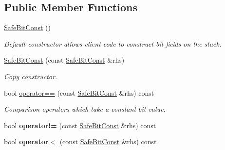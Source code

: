 \subsection*{Public Member Functions}
\begin{DoxyCompactItemize}
\item 
\hypertarget{classLoki_1_1SafeBitConst_a5ca867866c32c41efd30b5912daf48ba}{}\hyperlink{classLoki_1_1SafeBitConst_a5ca867866c32c41efd30b5912daf48ba}{Safe\+Bit\+Const} ()\label{classLoki_1_1SafeBitConst_a5ca867866c32c41efd30b5912daf48ba}

\begin{DoxyCompactList}\small\item\em Default constructor allows client code to construct bit fields on the stack. \end{DoxyCompactList}\item 
\hypertarget{classLoki_1_1SafeBitConst_affc6ec193df68bc5888c3e0249318b09}{}\hyperlink{classLoki_1_1SafeBitConst_affc6ec193df68bc5888c3e0249318b09}{Safe\+Bit\+Const} (const \hyperlink{classLoki_1_1SafeBitConst}{Safe\+Bit\+Const} \&rhs)\label{classLoki_1_1SafeBitConst_affc6ec193df68bc5888c3e0249318b09}

\begin{DoxyCompactList}\small\item\em Copy constructor. \end{DoxyCompactList}\item 
\hypertarget{classLoki_1_1SafeBitConst_afa999efd984ef43c0e8c1a637df87412}{}bool \hyperlink{classLoki_1_1SafeBitConst_afa999efd984ef43c0e8c1a637df87412}{operator==} (const \hyperlink{classLoki_1_1SafeBitConst}{Safe\+Bit\+Const} \&rhs) const \label{classLoki_1_1SafeBitConst_afa999efd984ef43c0e8c1a637df87412}

\begin{DoxyCompactList}\small\item\em Comparison operators which take a constant bit value. \end{DoxyCompactList}\item 
\hypertarget{classLoki_1_1SafeBitConst_aee72c0265542a216c28355cbac610560}{}bool {\bfseries operator!=} (const \hyperlink{classLoki_1_1SafeBitConst}{Safe\+Bit\+Const} \&rhs) const \label{classLoki_1_1SafeBitConst_aee72c0265542a216c28355cbac610560}

\item 
\hypertarget{classLoki_1_1SafeBitConst_ae2ba34c541cdcfffb45f8e0ff3956d23}{}bool {\bfseries operator$<$} (const \hyperlink{classLoki_1_1SafeBitConst}{Safe\+Bit\+Const} \&rhs) const \label{classLoki_1_1SafeBitConst_ae2ba34c541cdcfffb45f8e0ff3956d23}


\end{DoxyCompactItemize}
